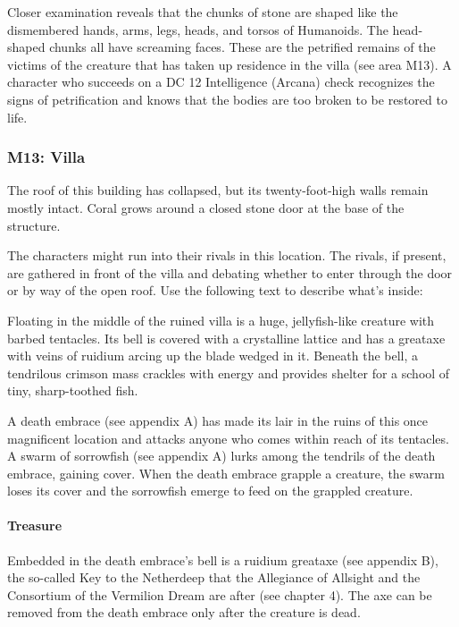 \documentclass[10pt,a4paper,twoside,bg=print,twocolumn,openany,nodeprecatedcode]{dndbook}
\begin{document}
Closer examination reveals that the chunks of stone are shaped like the dismembered hands, arms, legs, heads, and torsos of Humanoids. The head-shaped chunks all have screaming faces. These are the petrified remains of the victims of the creature that has taken up residence in the villa (see area M13). A character who succeeds on a DC 12 Intelligence (Arcana) check recognizes the signs of petrification and knows that the bodies are too broken to be restored to life.

\subsubsection{M13: Villa}
\begin{DndReadAloud}{}
The roof of this building has collapsed, but its twenty-foot-high walls remain mostly intact. Coral grows around a closed stone door at the base of the structure.

\end{DndReadAloud}

The characters might run into their rivals in this location. The rivals, if present, are gathered in front of the villa and debating whether to enter through the door or by way of the open roof. Use the following text to describe what's inside:

\begin{DndReadAloud}{}
Floating in the middle of the ruined villa is a huge, jellyfish-like creature with barbed tentacles. Its bell is covered with a crystalline lattice and has a greataxe with veins of ruidium arcing up the blade wedged in it. Beneath the bell, a tendrilous crimson mass crackles with energy and provides shelter for a school of tiny, sharp-toothed fish.

\end{DndReadAloud}

A death embrace (see appendix A) has made its lair in the ruins of this once magnificent location and attacks anyone who comes within reach of its tentacles. A swarm of sorrowfish (see appendix A) lurks among the tendrils of the death embrace, gaining cover. When the death embrace grapple a creature, the swarm loses its cover and the sorrowfish emerge to feed on the grappled creature.

\paragraph{Treasure}
Embedded in the death embrace's bell is a ruidium greataxe (see appendix B), the so-called Key to the Netherdeep that the Allegiance of Allsight and the Consortium of the Vermilion Dream are after (see chapter 4). The axe can be removed from the death embrace only after the creature is dead.
\end{document}
